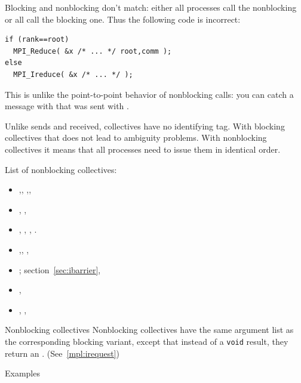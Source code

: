 \begin{remark}
  Blocking and nonblocking don't match: either all processes
  call the nonblocking or all call the blocking one.
  Thus the following code is incorrect:
\begin{lstlisting}
if (rank==root)
  MPI_Reduce( &x /* ... */ root,comm );
else
  MPI_Ireduce( &x /* ... */ );
\end{lstlisting}
  This is unlike the point-to-point behavior of nonblocking calls:
  you can catch a message with 
  that was sent with .
\end{remark}

\begin{remark}
  Unlike sends and received, collectives have no identifying tag.
  With blocking collectives that does not lead to ambiguity problems.
  With nonblocking collectives it means that all processes
  need to issue them in identical order.
\end{remark}

List of nonblocking collectives:
\begin{itemize}
\item 
  ,,
  ,,
\item 
  , ,
\item 
  ,
  ,
  ,
  .
\item 
  ,, ,
\item 
  ; section~\ref{sec:ibarrier},
\item {},
\item {}, ,
\end{itemize}

\begin{mplnote}{Nonblocking collectives}
  Nonblocking collectives have the same argument list as the
  corresponding blocking variant, except that
  instead of a \lstinline+void+ result,
  they return an .
  (See~\ref{mpl:irequest})
\end{mplnote}

 {Examples}

